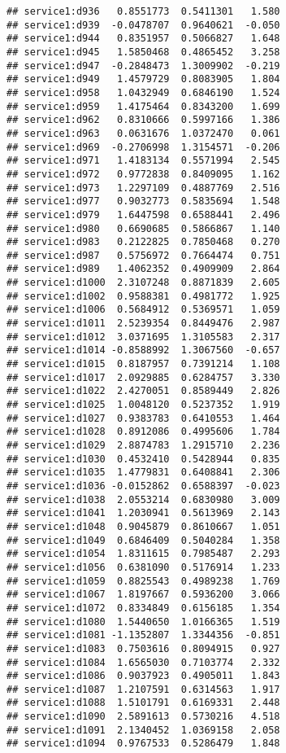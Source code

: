 \documentclass[
]{article}
\begin{document}
\begin{verbatim}
## service1:d936   0.8551773  0.5411301   1.580
## service1:d939  -0.0478707  0.9640621  -0.050
## service1:d944   0.8351957  0.5066827   1.648
## service1:d945   1.5850468  0.4865452   3.258
## service1:d947  -0.2848473  1.3009902  -0.219
## service1:d949   1.4579729  0.8083905   1.804
## service1:d958   1.0432949  0.6846190   1.524
## service1:d959   1.4175464  0.8343200   1.699
## service1:d962   0.8310666  0.5997166   1.386
## service1:d963   0.0631676  1.0372470   0.061
## service1:d969  -0.2706998  1.3154571  -0.206
## service1:d971   1.4183134  0.5571994   2.545
## service1:d972   0.9772838  0.8409095   1.162
## service1:d973   1.2297109  0.4887769   2.516
## service1:d977   0.9032773  0.5835694   1.548
## service1:d979   1.6447598  0.6588441   2.496
## service1:d980   0.6690685  0.5866867   1.140
## service1:d983   0.2122825  0.7850468   0.270
## service1:d987   0.5756972  0.7664474   0.751
## service1:d989   1.4062352  0.4909909   2.864
## service1:d1000  2.3107248  0.8871839   2.605
## service1:d1002  0.9588381  0.4981772   1.925
## service1:d1006  0.5684912  0.5369571   1.059
## service1:d1011  2.5239354  0.8449476   2.987
## service1:d1012  3.0371695  1.3105583   2.317
## service1:d1014 -0.8588992  1.3067560  -0.657
## service1:d1015  0.8187957  0.7391214   1.108
## service1:d1017  2.0929885  0.6284757   3.330
## service1:d1022  2.4270051  0.8589449   2.826
## service1:d1025  1.0048120  0.5237352   1.919
## service1:d1027  0.9383783  0.6410553   1.464
## service1:d1028  0.8912086  0.4995606   1.784
## service1:d1029  2.8874783  1.2915710   2.236
## service1:d1030  0.4532410  0.5428944   0.835
## service1:d1035  1.4779831  0.6408841   2.306
## service1:d1036 -0.0152862  0.6588397  -0.023
## service1:d1038  2.0553214  0.6830980   3.009
## service1:d1041  1.2030941  0.5613969   2.143
## service1:d1048  0.9045879  0.8610667   1.051
## service1:d1049  0.6846409  0.5040284   1.358
## service1:d1054  1.8311615  0.7985487   2.293
## service1:d1056  0.6381090  0.5176914   1.233
## service1:d1059  0.8825543  0.4989238   1.769
## service1:d1067  1.8197667  0.5936200   3.066
## service1:d1072  0.8334849  0.6156185   1.354
## service1:d1080  1.5440650  1.0166365   1.519
## service1:d1081 -1.1352807  1.3344356  -0.851
## service1:d1083  0.7503616  0.8094915   0.927
## service1:d1084  1.6565030  0.7103774   2.332
## service1:d1086  0.9037923  0.4905011   1.843
## service1:d1087  1.2107591  0.6314563   1.917
## service1:d1088  1.5101791  0.6169331   2.448
## service1:d1090  2.5891613  0.5730216   4.518
## service1:d1091  2.1340452  1.0369158   2.058
## service1:d1094  0.9767533  0.5286479   1.848

\end{verbatim}
\end{document}
